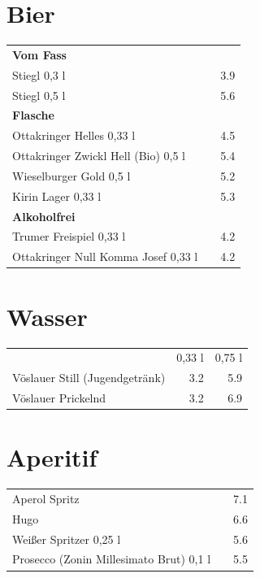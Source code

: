 \documentclass[a4paper,12pt]{article}
\begin{document}
\begin{multicols}{2}
\section*{Bier}
\begin{tabular}{Lrr}
\textbf{Vom Fass}\\
\hspace{0.4cm}Stiegl 0,3 l & & 3.9\\
\hspace{0.4cm}Stiegl 0,5 l & & 5.6\vspace{0.1cm}\\
\textbf{Flasche}\\
\hspace{0.4cm}Ottakringer Helles 0,33 l & & 4.5\\
\hspace{0.4cm}Ottakringer Zwickl Hell (Bio) 0,5 l & & 5.4\\
\hspace{0.4cm}Wieselburger Gold 0,5 l & & 5.2\\
\hspace{0.4cm}Kirin Lager 0,33 l & & 5.3\vspace{0.1cm}\\
\textbf{Alkoholfrei}\\
\hspace{0.4cm}Trumer Freispiel 0,33 l & & 4.2\\
\hspace{0.4cm}Ottakringer Null Komma Josef 0,33 l & & 4.2
\end{tabular}

\columnbreak
\section*{Wasser}
\begin{tabular}{Lrr}
& 0,33 l & 0,75 l\\
Vöslauer Still (Jugendgetränk) & 3.2 & 5.9\\
Vöslauer Prickelnd & 3.2 & 6.9
\end{tabular}

\section*{Aperitif}
\begin{tabular}{Lrr}
Aperol Spritz & & 7.1\\
Hugo & & 6.6\\
Weißer Spritzer 0,25 l & & 5.6\\
Prosecco (Zonin Millesimato Brut) 0,1 l & & 5.5
\end{tabular}


\end{multicols}
\end{document}
